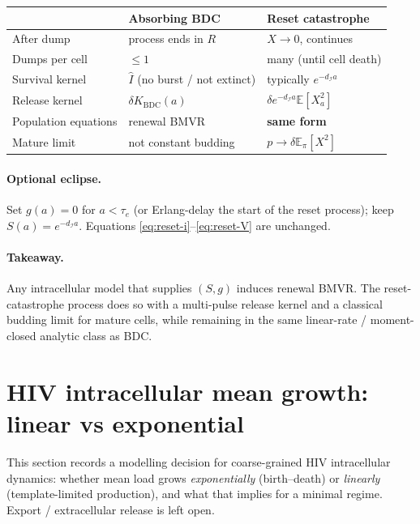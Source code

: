 \documentclass[11pt,a4paper]{article}
\newcommand{\E}{\mathbb{E}}
\newcommand{\Ihat}{\widehat{I}}
\newcommand{\Icell}{\mathcal{I}}
\theoremstyle{plain}
\theoremstyle{definition}
\theoremstyle{remark}
\begin{document}
\begin{center}
\renewcommand{\arraystretch}{1.25}
\begin{tabular}{@{}lll@{}}
\toprule
 & Absorbing BDC & Reset catastrophe \\
\midrule
After dump & process ends in $R$ & $X\to 0$, continues \\
Dumps per cell & $\le 1$ & many (until cell death) \\
Survival kernel & $\Ihat$ (no burst / not extinct) & typically $e^{-d_{\Icell}a}$ \\
Release kernel & $\delta K_{\mathrm{BDC}}(a)$ & $\delta e^{-d_{\Icell}a}\E[X_a^2]$ \\
Population equations & renewal BMVR & \textbf{same form} \\
Mature limit & not constant budding & $p\to\delta\E_\pi[X^2]$ \\
\bottomrule
\end{tabular}
\end{center}

\paragraph{Optional eclipse.}
Set $g(a)=0$ for $a<\tau_e$ (or Erlang-delay the start of the reset process);
keep $S(a)=e^{-d_{\Icell}a}$. Equations \eqref{eq:reset-i}--\eqref{eq:reset-V}
are unchanged.

\paragraph{Takeaway.}
Any intracellular model that supplies $(S,g)$ induces renewal BMVR. The
reset-catastrophe process does so with a multi-pulse release kernel and a
classical budding limit for mature cells, while remaining in the same
linear-rate / moment-closed analytic class as BDC.

\section{HIV intracellular mean growth: linear vs exponential}
\label{sec:hiv-mean-growth}

This section records a modelling decision for coarse-grained HIV intracellular
dynamics: whether mean load grows \emph{exponentially} (birth--death) or
\emph{linearly} (template-limited production), and what that implies for a
minimal regime. Export / extracellular release is left open.
\end{document}
